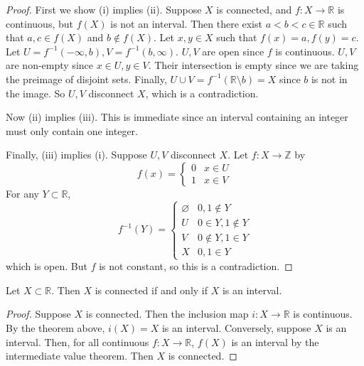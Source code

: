 \begin{proof}
	First we show (i) implies (ii).
	Suppose \( X \) is connected, and \( f \colon X \to \mathbb R \) is continuous, but \( f(X) \) is not an interval.
	Then there exist \( a<b<c \in \mathbb R \) such that \( a,c \in f(X) \) and \( b \not\in f(X) \).
	Let \( x,y \in X \) such that \( f(x) = a, f(y) = c \).
	Let \( U = f^{-1}(-\infty, b), V = f^{-1}(b,\infty) \).
	\( U, V \) are open since \( f \) is continuous.
	\( U, V \) are non-empty since \( x \in U, y \in V \).
	Their intersection is empty since we are taking the preimage of disjoint sets.
	Finally, \( U \cup V = f^{-1}(\mathbb R \setminus b) = X \) since \( b \) is not in the image.
	So \( U, V \) disconnect \( X \), which is a contradiction.

	Now (ii) implies (iii).
	This is immediate since an interval containing an integer must only contain one integer.

	Finally, (iii) implies (i).
	Suppose \( U, V \) disconnect \( X \).
	Let \( f \colon X \to \mathbb Z \) by
	\[
		f(x) = \begin{cases}
			0 & x \in U \\
			1 & x \in V
		\end{cases}
	\]
	For any \( Y \subset \mathbb R \),
	\[
		f^{-1}(Y) = \begin{cases} \varnothing & 0,1 \not\in Y      \\
              U           & 0\in Y, 1\not\in Y \\
              V           & 0\not\in Y, 1\in Y \\
              X           & 0,1 \in Y
		\end{cases}
	\]
	which is open.
	But \( f \) is not constant, so this is a contradiction.
\end{proof}
\begin{corollary}
	Let \( X \subset \mathbb R \).
	Then \( X \) is connected if and only if \( X \) is an interval.
\end{corollary}
\begin{proof}
	Suppose \( X \) is connected.
	Then the inclusion map \( i \colon X \to \mathbb R \) is continuous.
	By the theorem above, \( i(X) = X \) is an interval.
	Conversely, suppose \( X \) is an interval.
	Then, for all continuous \( f \colon X \to \mathbb R \), \( f(X) \) is an interval by the intermediate value theorem.
	Then \( X \) is connected.
\end{proof}
